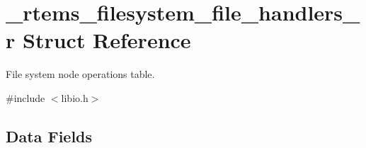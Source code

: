 \hypertarget{struct__rtems__filesystem__file__handlers__r}{}\section{\+\_\+rtems\+\_\+filesystem\+\_\+file\+\_\+handlers\+\_\+r Struct Reference}
\label{struct__rtems__filesystem__file__handlers__r}


File system node operations table.  




{\ttfamily \#include $<$libio.\+h$>$}

\subsection*{Data Fields}
